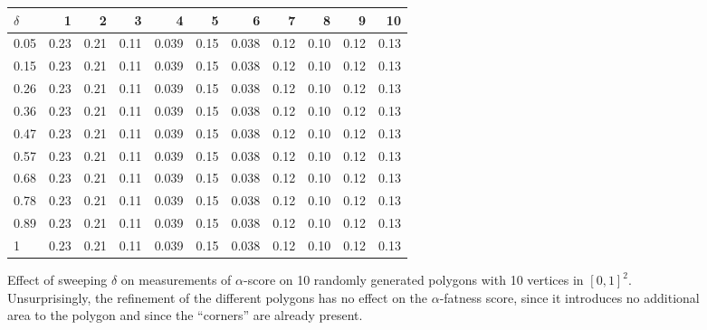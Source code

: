 \documentclass[]{jocg}
\theoremstyle{definition}
\theoremstyle{remark}
\begin{document}
\begin{figure}[t]
  \centering
  \begin{tabular}{lrrrrrrrrrr}
    \toprule
    $\delta$ & 1 & 2 & 3 & 4 & 5 & 6 & 7 & 8 & 9 & 10 \\
    \midrule
    0.05 &  0.23 &  0.21 &  0.11 &  0.039 &  0.15 &  0.038 & 0.12 &  0.10 &  0.12 &  0.13 \\
    0.15 &  0.23 &  0.21 &  0.11 &  0.039 &  0.15 &  0.038 & 0.12 &  0.10 &  0.12 &  0.13 \\
    0.26 &  0.23 &  0.21 &  0.11 &  0.039 &  0.15 &  0.038 & 0.12 &  0.10 &  0.12 &  0.13 \\
    0.36 &  0.23 &  0.21 &  0.11 &  0.039 &  0.15 &  0.038 & 0.12 &  0.10 &  0.12 &  0.13 \\
    0.47 &  0.23 &  0.21 &  0.11 &  0.039 &  0.15 &  0.038 & 0.12 &  0.10 &  0.12 &  0.13 \\
    0.57 &  0.23 &  0.21 &  0.11 &  0.039 &  0.15 &  0.038 & 0.12 &  0.10 &  0.12 &  0.13 \\
    0.68 &  0.23 &  0.21 &  0.11 &  0.039 &  0.15 &  0.038 & 0.12 &  0.10 &  0.12 &  0.13 \\
    0.78 &  0.23 &  0.21 &  0.11 &  0.039 &  0.15 &  0.038 & 0.12 &  0.10 &  0.12 &  0.13 \\
    0.89 &  0.23 &  0.21 &  0.11 &  0.039 &  0.15 &  0.038 & 0.12 &  0.10 &  0.12 &  0.13 \\
    1    &  0.23 &  0.21 &  0.11 &  0.039 &  0.15 &  0.038 & 0.12 &  0.10 &  0.12 &  0.13 \\
    \bottomrule
  \end{tabular}
  \caption{%
    Effect of sweeping $\delta$ on measurements of $\alpha$-score on
    10 randomly generated polygons with 10 vertices in $[0,1]^2$.
    Unsurprisingly, the refinement of the different polygons has no effect on
    the $\alpha$-fatness score, since it introduces no additional area to the
    polygon and since the ``corners'' are already present.
  }
  \label{fig:delta-alpha}
\end{figure}
\end{document}
